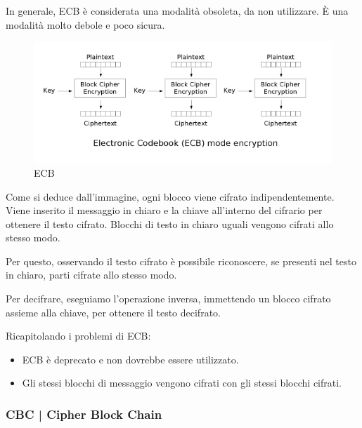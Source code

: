  

\textsf{\small In generale, ECB è considerata una modalità obsoleta, da non utilizzare. È una modalità molto debole e poco sicura.}

\begin{figure}[H]
	\centering
	\includegraphics[width=.9\textwidth, height=.9\textheight, keepaspectratio]{./images/aes_modes/ecb_encryption.png} %
	\caption{ECB}
	\label{fig:ecb}
\end{figure}

\textsf{\small Come si deduce dall'immagine, ogni blocco viene cifrato indipendentemente. Viene inserito il messaggio in chiaro e la chiave all'interno del cifrario per ottenere il testo cifrato. Blocchi di testo in chiaro uguali vengono cifrati allo stesso modo.}

\textsf{\small Per questo, osservando il testo cifrato è possibile riconoscere, se presenti nel testo in chiaro, parti cifrate allo stesso modo. }

\textsf{\small Per decifrare, eseguiamo l'operazione inversa, immettendo un blocco cifrato assieme alla chiave, per ottenere il testo decifrato.}


\textsf{\small Ricapitolando i problemi di ECB:}

\begin{itemize}
	\item \textsf{\small ECB è deprecato e non dovrebbe essere utilizzato.}
	\item \textsf{\small Gli stessi blocchi di messaggio vengono cifrati con gli stessi blocchi cifrati.}
\end{itemize}


\subsubsection{CBC | Cipher Block Chain}

